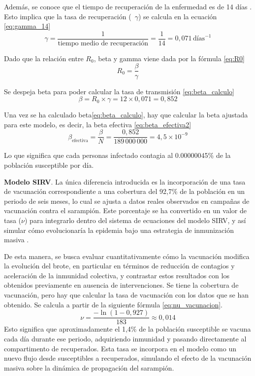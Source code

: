 Además, se conoce que el tiempo de recuperación de la enfermedad es de 14 días \cite{ops_sarampion}. Esto implica que la tasa de recuperación (~$\gamma$) se calcula en la ecuación \eqref{eq:gamma_14}
\begin{equation}
\gamma = \frac{1}{\text{tiempo medio de recuperación}} = \frac{1}{14} = 0{,}071 \,\text{días}^{-1}
\label{eq:gamma_14}
\end{equation}

Dado que la relación entre $R_0$, beta y gamma viene dada por la fórmula \eqref{eq:R0}
\begin{equation}
R_0 = \frac{\beta}{\gamma}
\label{eq:R0}
\end{equation}

Se despeja beta para poder calcular la tasa de transmisión \eqref{eq:beta_calculo}
\begin{equation}
\beta = R_0 \times \gamma = 12 \times 0{,}071 = 0{,}852
\label{eq:beta_calculo}
\end{equation}

Una vez se ha calculado beta\eqref{eq:beta_calculo}, hay que calcular la beta ajustada para este modelo, es decir, la beta efectiva \eqref{eq:beta_efectiva2}
\begin{equation}
\beta_{\text{efectiva}} = \frac{\beta}{N} = \frac{0{,}852}{189\,000\,000} = 4{,}5 \times 10^{-9}
\label{eq:beta_efectiva2}
\end{equation}

Lo que significa que cada personas infectado contagia al 0.00000045\% de la población susceptible por día.

\vspace{2em}
\textbf{Modelo SIRV}. La única diferencia introducida es la incorporación de una tasa de vacunación correspondiente a una cobertura del 92,7\% de la población en un periodo de seis meses, lo cual se ajusta a datos reales observados en campañas de vacunación contra el sarampión. Este porcentaje se ha convertido en un valor de tasa ($\nu$) para integrarlo dentro del sistema de ecuaciones del modelo SIRV, y así simular cómo evolucionaría la epidemia bajo una estrategia de inmunización masiva \cite{cdc_measles_cases_2025}.

De esta manera, se busca evaluar cuantitativamente cómo la vacunación modifica la evolución del brote, en particular en términos de reducción de contagios y aceleración de la inmunidad colectiva, y contrastar estos resultados con los obtenidos previamente en ausencia de intervenciones.
Se tiene la cobertura de vacunación, pero hay que calcular la tasa de vacunación con los datos que se han obtenido. Se calcula a partir de la siguiente fórmula \eqref{eq:nu_vacunacion}. 
\begin{equation}
\nu = \frac{-\ln(1 - 0{,}927)}{183} \approx 0{,}014
\label{eq:nu_vacunacion}
\end{equation}
Esto significa que aproximadamente el 1,4\% de la población susceptible se vacuna cada día durante ese periodo, adquiriendo inmunidad y pasando directamente al compartimento de recuperados. Esta tasa se incorpora en el modelo como un nuevo flujo desde susceptibles a recuperados, simulando el efecto de la vacunación masiva sobre la dinámica de propagación del sarampión.


